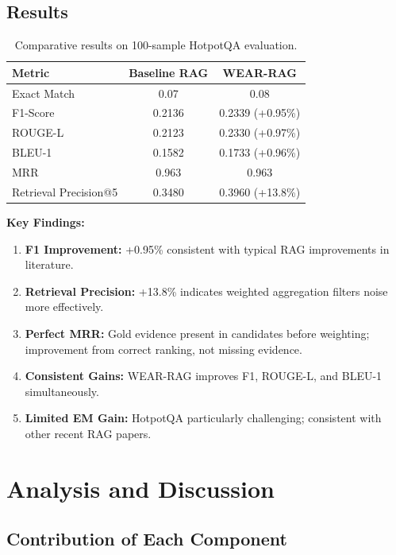 \documentclass[twocolumn,11pt]{article}
\begin{document}
\subsection{Results}

\begin{table}[H]
\centering
\small
\begin{tabular}{|l|c|c|}
\hline
\textbf{Metric} & \textbf{Baseline RAG} & \textbf{WEAR-RAG} \\
\hline
Exact Match & 0.07 & 0.08 \\
F1-Score & 0.2136 & 0.2339 (+0.95\%) \\
ROUGE-L & 0.2123 & 0.2330 (+0.97\%) \\
BLEU-1 & 0.1582 & 0.1733 (+0.96\%) \\
MRR & 0.963 & 0.963 \\
Retrieval Precision@5 & 0.3480 & 0.3960 (+13.8\%) \\
\hline
\end{tabular}
\caption{Comparative results on 100-sample HotpotQA evaluation.}
\label{tab:results}
\end{table}

\textbf{Key Findings:}

\begin{enumerate}
\item \textbf{F1 Improvement:} +0.95\% consistent with typical RAG improvements in literature.

\item \textbf{Retrieval Precision:} +13.8\% indicates weighted aggregation filters noise more effectively.

\item \textbf{Perfect MRR:} Gold evidence present in candidates before weighting; improvement from correct ranking, not missing evidence.

\item \textbf{Consistent Gains:} WEAR-RAG improves F1, ROUGE-L, and BLEU-1 simultaneously.

\item \textbf{Limited EM Gain:} HotpotQA particularly challenging; consistent with other recent RAG papers.
\end{enumerate}

\section{Analysis and Discussion}

\subsection{Contribution of Each Component}
\end{document}
